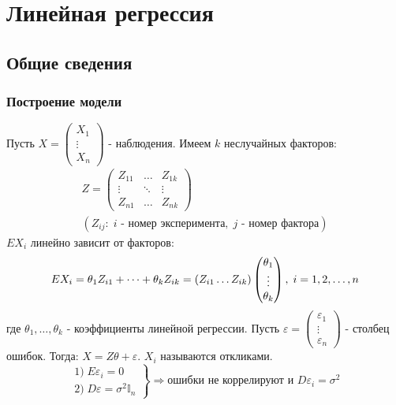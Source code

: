 \chapter{Линейная регрессия}\label{cha:linreg}

\section{Общие сведения}\label{cha:linreg/sec:basic}


\subsection{Построение модели}\label{cha:linreg/sec:basic/subsec:theory/subsubsec:model}


Пусть $X = \begin{pmatrix}
	X_1 \\ \vdots \\ X_n
\end{pmatrix}$ - наблюдения. Имеем $k$ неслучайных факторов:
$$\begin{gathered}
	Z = 
	\begin{pmatrix}
		Z_{11} & \dots & Z_{1k} \\
		\vdots & \ddots & \vdots \\
		Z_{n1} & \dots & Z_{nk}
	\end{pmatrix} \\
	\left(Z_{ij}: \; i \text{ - номер эксперимента}, \; j \text{ - номер фактора}\right)
\end{gathered}$$
$E X_i$ линейно зависит от факторов:
$$E X_i = \theta_1 Z_{i1} + \dots + \theta_k Z_{ik} = (Z_{i1}\dots Z_{ik})
\begin{pmatrix}
	\theta_1 \\ \vdots \\ \theta_k
\end{pmatrix}, \; i = 1,2,\dots,n$$
где $\theta_1, \dots, \theta_k$ - коэффициенты линейной регрессии.
Пусть $\varepsilon = 
\begin{pmatrix}
	\varepsilon_1 \\ \vdots \\ \varepsilon_n
\end{pmatrix}$ - столбец ошибок. Тогда:
$X = Z \theta + \varepsilon$. $X_i$ называются откликами.
$$\left.
  	\begin{array}{ccc}
		1) \; E \varepsilon_i = 0 \\
		2) \; D \varepsilon = \sigma^2 \mathbb{I}_n
  	\end{array}
\right\} \Rightarrow \text{ошибки не коррелируют и } D \varepsilon_i = \sigma^2$$

